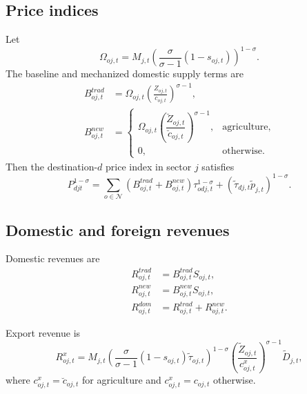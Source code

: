 \documentclass[11pt]{article}
\newcommand{\Nreg}{\mathcal{N}}
\begin{document}
\subsection{Price indices}
Let
\begin{equation}
  \Omega_{oj,t}
  =
  M_{j,t}
  \left( \frac{\sigma}{\sigma-1}(1-s_{oj,t}) \right)^{1-\sigma}.
\end{equation}
The baseline and mechanized domestic supply terms are
\begin{align}
  B^{trad}_{oj,t} &= \Omega_{oj,t} \left( \frac{Z_{oj,t}}{c_{oj,t}} \right)^{\sigma-1}, \\
  B^{new}_{oj,t} &=
  \begin{cases}
    \Omega_{oj,t} \left( \dfrac{\breve Z_{oj,t}}{\breve c_{oj,t}} \right)^{\sigma-1},
    & \text{agriculture}, \\
    0, & \text{otherwise}.
  \end{cases}
\end{align}
Then the destination-$d$ price index in sector $j$ satisfies
\begin{equation}
  P_{djt}^{1-\sigma}
  =
  \sum_{o \in \Nreg} \left( B^{trad}_{oj,t} + B^{new}_{oj,t} \right) \tau_{odj,t}^{1-\sigma}
  + (\tilde\tau_{dj,t} \tilde p_{j,t})^{1-\sigma}.
\end{equation}

\subsection{Domestic and foreign revenues}
Domestic revenues are
\begin{align}
  R^{trad}_{oj,t} &= B^{trad}_{oj,t} S_{oj,t}, \\
  R^{new}_{oj,t} &= B^{new}_{oj,t} S_{oj,t}, \\
  R^{dom}_{oj,t} &= R^{trad}_{oj,t} + R^{new}_{oj,t}.
\end{align}

Export revenue is
\begin{equation}
  R^{x}_{oj,t}
  =
  M_{j,t}
  \left(
    \frac{\sigma}{\sigma-1}
    (1-s_{oj,t}) \tilde\tau_{oj,t}
  \right)^{1-\sigma}
  \left( \frac{\tilde Z_{oj,t}}{c^x_{oj,t}} \right)^{\sigma-1}
  \tilde D_{j,t},
\end{equation}
where $c^x_{oj,t} = \breve c_{oj,t}$ for agriculture and $c^x_{oj,t} = c_{oj,t}$ otherwise.
\end{document}
